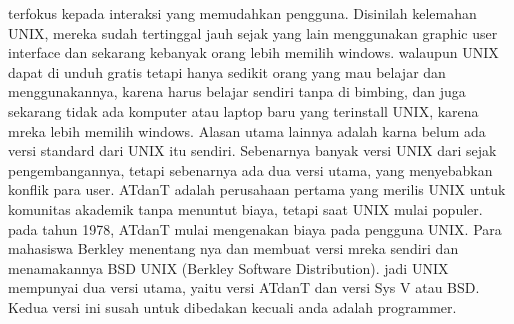 terfokus kepada interaksi yang memudahkan pengguna. Disinilah kelemahan UNIX, mereka sudah tertinggal jauh sejak yang lain menggunakan graphic user interface dan sekarang kebanyak orang lebih memilih windows. walaupun UNIX dapat di unduh gratis tetapi hanya sedikit orang yang mau belajar dan menggunakannya, karena harus belajar sendiri tanpa di bimbing, dan juga sekarang tidak ada komputer atau laptop baru yang terinstall UNIX, karena mreka lebih memilih windows. Alasan utama lainnya adalah karna belum ada versi standard dari UNIX itu sendiri. Sebenarnya banyak versi UNIX dari sejak pengembangannya, tetapi sebenarnya ada dua versi utama, yang menyebabkan konflik para user. ATdanT adalah perusahaan pertama yang merilis UNIX untuk komunitas akademik tanpa menuntut biaya, tetapi saat UNIX mulai populer. pada tahun 1978, ATdanT mulai mengenakan biaya pada pengguna UNIX. Para mahasiswa Berkley menentang nya dan membuat versi mreka sendiri dan menamakannya BSD UNIX (Berkley Software Distribution). jadi UNIX mempunyai dua versi utama, yaitu versi ATdanT dan versi Sys V atau BSD. Kedua versi ini susah untuk dibedakan kecuali anda adalah programmer.
	
